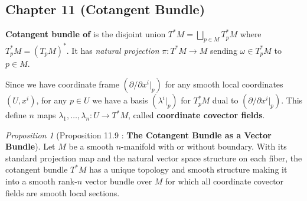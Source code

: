 \documentclass[a4paper]{article}
\theoremstyle{remark}
\newtheorem{prop}{Proposition}
\newcommand{\doo}{\partial}    %
\begin{document}
\subsection{Chapter 11 (Cotangent Bundle)}

\textbf{Cotangent bundle of  }is the disjoint union $T^*M =\bigsqcup_{p \in M} T^*_pM$  where $T^*_pM = (T_pM)^*$. It has \textit{natural projection} $\pi : T^*M \to M$ sending $\omega \in T^*_pM$ to $p \in M$.

Since we have coordinate frame $(\doo / \doo x^i|_p )$ for any smooth local coordinates $(U,x^i)$, for any $p \in U$ we have a basis $(\lambda^i|_p)$ for $T^*_pM$ dual to $(\doo / \doo x^i|_p )$. This define $n$ maps $\lambda_1,\dots,\lambda_n : U \to T^*M$, called \textbf{coordinate covector fields}.

\begin{prop}[Proposition 11.9 : \textbf{The Cotangent Bundle as a Vector Bundle}]
Let $M$ be a smooth $n$-manifold with or without boundary. With its standard projection map and the natural vector space structure on each fiber, the cotangent bundle $T^*M$ has a unique topology and smooth structure making it into a smooth rank-$n$ vector bundle over $M$ for which all coordinate covector fields are smooth local sections.
\end{prop}
\end{document}
